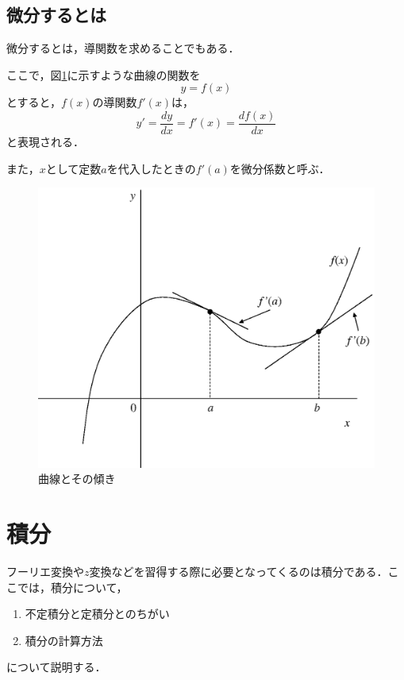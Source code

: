 \subsection{微分するとは}

微分するとは，導関数を求めることでもある．

ここで，図\ref{fig:zu-0-1}に示すような曲線の関数を
\begin{equation}
y=f(x)
\end{equation}
とすると，$f(x)$の導関数$f'(x)$は，
\begin{equation}
y'=\frac{dy}{dx}=f'(x)=\frac{df(x)}{dx}
\end{equation}
と表現される．

また，$x$として定数$a$を代入したときの$f'(a)$を微分係数と呼ぶ．


\begin{figure}[H]
\begin{center}
\includegraphics[width=.7\textwidth]{fig/zu-0-1.eps}
\end{center}
\caption{曲線とその傾き}
\label{fig:zu-0-1}
\end{figure}


\section{積分}

フーリエ変換や$z$変換などを習得する際に必要となってくるのは積分である．ここでは，積分について，
\begin{enumerate}
\item 不定積分と定積分とのちがい
\item 積分の計算方法
\end{enumerate}
について説明する．

